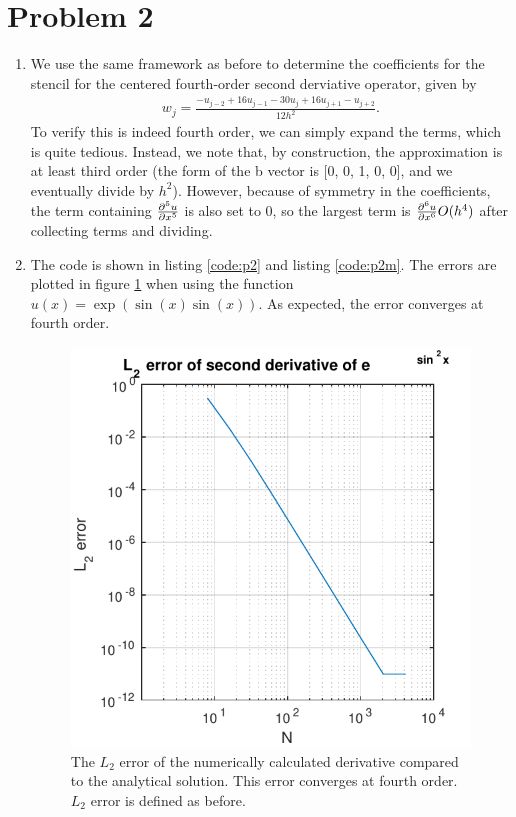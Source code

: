 \documentclass{article}
\begin{document}
\section{Problem 2}
\begin{enumerate}

\item
We use the same framework as before to determine the coefficients for the stencil for the centered fourth-order second derviative operator, given by
\begin{align}
w_j = \frac{-u_{j-2} + 16 u_{j-1} -30 u_j + 16 u_{j+1} - u_{j+2}}{12h^2}.
\end{align}
To verify this is indeed fourth order, we can simply expand the terms, which is quite tedious.
Instead, we note that, by construction, the approximation is at least third order (the form of the b vector is [0, 0, 1, 0, 0], and we eventually divide by $h^2$).
However, because of symmetry in the coefficients, the term containing $\frac{\partial^{5} u}{ \partial x^{5}}$ is also set to 0, so the largest term is $\frac{\partial^{6} u}{ \partial x^{6}} O(h^4)$ after collecting terms and dividing.

\item
The code is shown in listing \ref{code:p2} and listing \ref{code:p2m}.
The errors are plotted in figure \ref{fig:p2} when using the function $u(x) = \exp(\sin(x) \sin(x))$. As expected, the error converges at fourth order.
\begin{figure}[!ht]
\centering
\includegraphics[scale=1]{p2err.pdf}
\caption{The $L_2$ error of the numerically calculated derivative compared to the analytical solution. This error converges at fourth order. $L_2$ error is defined as before.}
\label{fig:p2}
\end{figure}


\end{enumerate}
\end{document}
